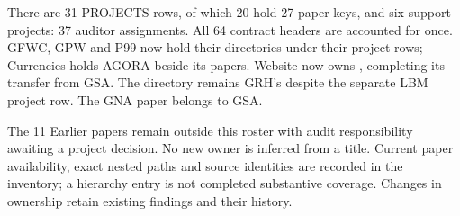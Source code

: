 There are 31 PROJECTS rows, of which 20 hold 27 paper keys, and six support projects: 37 auditor assignments. All 64 contract headers are accounted for once. GFWC, GPW and P99 now hold their directories under their project rows; Currencies holds AGORA beside its papers. Website now owns , completing its transfer from GSA. The directory  remains GRH's despite the separate LBM project row. The GNA paper belongs to GSA.

The 11 Earlier papers remain outside this roster with audit responsibility awaiting a project decision. No new owner is inferred from a title. Current paper availability, exact nested paths and source identities are recorded in the inventory; a hierarchy entry is not completed substantive coverage. Changes in ownership retain existing findings and their history.

